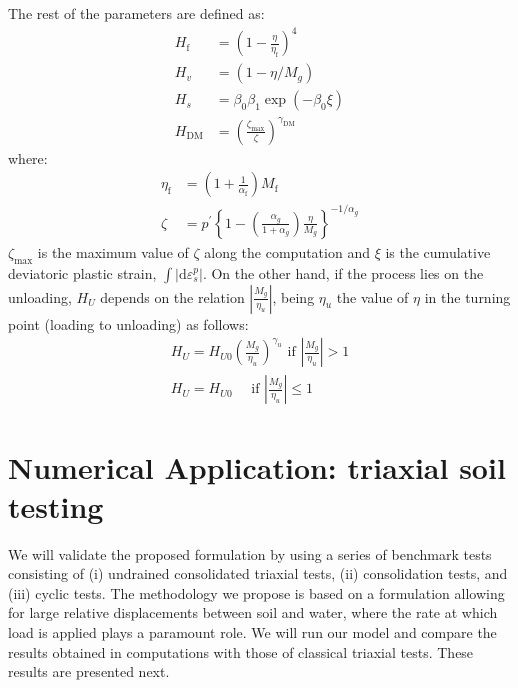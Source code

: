 \documentclass[preprint,12pt,a4paper]{elsarticle}
\begin{document}
The rest of the parameters are defined as:
\begin{equation}
\begin{aligned} H_{\mathrm{f}} &=\left(1-\frac{\eta}{\eta_{\mathrm{f}}}\right)^{4} \\ 
H_{v} &=\left(1-\eta / M_{g}\right) \\ 
H_{s} &=\beta_{0} \beta_{1} \exp \left(-\beta_{0} \xi\right) \\ 
H_{\mathrm{DM}} &=\left(\frac{\zeta_{\mathrm{max}}}{\zeta}\right)^{\gamma_{\mathrm{DM}}} \end{aligned}
\end{equation}
where:
\begin{equation}
\begin{aligned} 
\eta_{\mathrm{f}} &=\left(1+\frac{1}{\alpha_{\mathrm{f}}}\right) M_{\mathrm{f}} \\ 
\zeta &=p^{\prime}\left\{1-\left(\frac{\alpha_{g}}{1+\alpha_{g}}\right) \frac{\eta}{M_{g}}\right\}^{-1 / \alpha_{g}} \end{aligned}
\end{equation}
$\zeta_{\mathrm{max}}$ is the maximum value of $\zeta$ along the computation and $\xi$ is the cumulative deviatoric plastic strain, $\int\left|\mathrm{d} \varepsilon_{s}^{p}\right| $. On the other hand, if the process lies on the unloading, $H_U$ depends on the relation $\left|\frac{M_{g}}{\eta_{u}}\right|$, being $\eta_{u}$ the value of $\eta$ in the turning point (loading to unloading) as follows:
\begin{equation}
\begin{array}{c}{H_{U}=H_{U 0}\left(\frac{M_{g}}{\eta_{u}}\right)^{\gamma_{u}} \text { if }\left|\frac{M_{g}}{\eta_{u}}\right|>1} \\ 
{H_{U}=H_{U 0} \quad \text { if }\left|\frac{M_{g}}{\eta_{u}}\right| \leqslant 1}\end{array}
\end{equation}



\section{Numerical Application: triaxial soil testing}
\label{sec:4}
We will validate the proposed formulation by using a series of benchmark tests consisting of (i) undrained consolidated triaxial tests, (ii) consolidation tests, and (iii) cyclic tests. The methodology we propose is based on a formulation allowing for large relative displacements between soil and water, where the rate at which load is applied plays a paramount role. We will run our model and compare the results obtained in computations with those of classical triaxial tests. These results are presented next.
\end{document}
